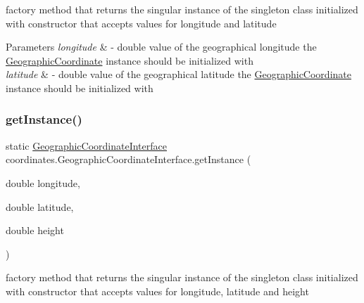 factory method that returns the singular instance of the singleton class initialized with constructor that accepts values for longitude and latitude 


\begin{DoxyParams}{Parameters}
{\em longitude} & -\/ double value of the geographical longitude the \hyperlink{classcoordinates_1_1_geographic_coordinate}{Geographic\+Coordinate} instance should be initialized with \\
\hline
{\em latitude} & -\/ double value of the geographical latitude the \hyperlink{classcoordinates_1_1_geographic_coordinate}{Geographic\+Coordinate} instance should be initialized with \\
\hline
\end{DoxyParams}
\mbox{\label{classcoordinates_1_1_geographic_coordinate_interface_a38627aff97345b4ae6c87e37e8a5e406}} 
\subsubsection{\texorpdfstring{get\+Instance()}{getInstance()}\hspace{0.1cm}{\footnotesize\ttfamily [3/3]}}
{\footnotesize\ttfamily static \hyperlink{classcoordinates_1_1_geographic_coordinate_interface}{Geographic\+Coordinate\+Interface} coordinates.\+Geographic\+Coordinate\+Interface.\+get\+Instance (\begin{DoxyParamCaption}\item[{double}]{longitude,  }\item[{double}]{latitude,  }\item[{double}]{height }\end{DoxyParamCaption})\hspace{0.3cm}{\ttfamily [static]}}



factory method that returns the singular instance of the singleton class initialized with constructor that accepts values for longitude, latitude and height 


